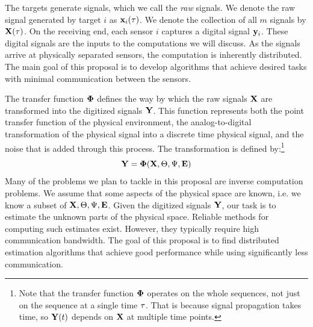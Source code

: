 The targets generate signals, which we call the {\em raw} signals. We denote the raw signal generated by target $i$ as $\mathbf{x}_i(\tau)$. We denote the collection of all $m$ signals by $\mathbf{X}(\tau)$. On the receiving end, each sensor $i$ captures a digital signal $\mathbf{y}_i$. These digital signals are the inputs to the computations we will discuss. As the signals arrive at physically separated sensors, the computation is inherently distributed. The main goal of this proposal is to develop algorithms that achieve desired tasks with minimal communication between the sensors.


The transfer function $\mathbf{\Phi}$ defines the way by which the raw signals $\mathbf{X}$ are transformed into the digitized signals $\mathbf{Y}$. This function represents both the point transfer function of the physical environment,
the analog-to-digital transformation of the physical signal into a discrete time physical signal, and the noise that is added through this process. The transformation is defined by:\footnote{Note that the transfer function $\mathbf{\Phi}$ operates on the whole sequences, not just on the sequence at a single time $\tau$. That is because signal propagation takes time, so $\mathbf{Y}(t)$ depends on $\mathbf{X}$ at multiple time points.}
\[
\mathbf{Y} = \mathbf{\Phi}(\mathbf{X},\Theta,\Psi,\mathbf{E})
\]
Many of the problems we plan to tackle in this proposal are inverse
computation problems. We assume that some aspects of the physical
space are known, i.e. we know a subset of
$\mathbf{X},\Theta,\Psi,\mathbf{E}$. Given the digitized signals
$\mathbf{Y}$, our task is to estimate the unknown parts of the physical
space. Reliable methods for computing such estimates exist. However,
they typically require high communication bandwidth. The goal of this
proposal is to find distributed estimation algorithms that achieve
good performance while using significantly less communication.

